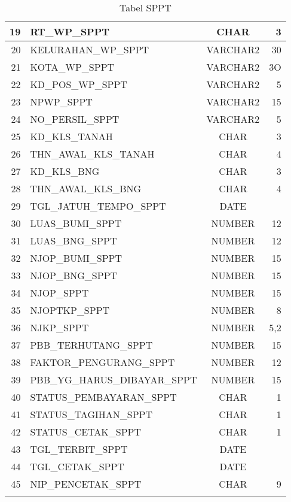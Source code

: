 \begin{enumerate}[1.]
\begin{longtable}{|r|l|c|r|}
    \hline
    19 & RT\_WP\_SPPT & CHAR & 3 \\
    \hline
    20 & KELURAHAN\_WP\_SPPT & VARCHAR2 & 30 \\
    \hline
    21 & KOTA\_WP\_SPPT & VARCHAR2 & 3O \\
    \hline
    22 & KD\_POS\_WP\_SPPT & VARCHAR2 & 5 \\
    \hline
    23 & NPWP\_SPPT & VARCHAR2 & 15 \\
    \hline
    24 & NO\_PERSIL\_SPPT & VARCHAR2 & 5 \\
    \hline
    25 & KD\_KLS\_TANAH & CHAR & 3 \\
    \hline
    26 & THN\_AWAL\_KLS\_TANAH & CHAR & 4 \\
    \hline
    27 & KD\_KLS\_BNG & CHAR & 3 \\
    \hline
    28 & THN\_AWAL\_KLS\_BNG & CHAR & 4 \\
    \hline
    29 & TGL\_JATUH\_TEMPO\_SPPT & DATE & \\
    \hline
    30 & LUAS\_BUMI\_SPPT & NUMBER & 12 \\
    \hline
    31 & LUAS\_BNG\_SPPT & NUMBER & 12 \\
    \hline
    32 & NJOP\_BUMI\_SPPT & NUMBER & 15 \\
    \hline
    33 & NJOP\_BNG\_SPPT & NUMBER & 15 \\
    \hline
    34 & NJOP\_SPPT & NUMBER & 15 \\
    \hline
    35 & NJOPTKP\_SPPT & NUMBER & 8 \\
    \hline
    36 & NJKP\_SPPT & NUMBER & 5,2 \\
    \hline
    37 & PBB\_TERHUTANG\_SPPT & NUMBER & 15 \\
    \hline
    38 & FAKTOR\_PENGURANG\_SPPT & NUMBER & 12 \\
    \hline
    39 & PBB\_YG\_HARUS\_DIBAYAR\_SPPT & NUMBER & 15 \\
    \hline
    40 & STATUS\_PEMBAYARAN\_SPPT & CHAR & 1 \\
    \hline
    41 & STATUS\_TAGIHAN\_SPPT & CHAR & 1 \\
    \hline
    42 & STATUS\_CETAK\_SPPT & CHAR & 1 \\
    \hline
    43 & TGL\_TERBIT\_SPPT & DATE & \\
    \hline
    44 & TGL\_CETAK\_SPPT & DATE & \\
    \hline
    45 & NIP\_PENCETAK\_SPPT & CHAR & 9 \\
    \hline
    \caption{Tabel SPPT}
  \end{longtable}
    

\end{enumerate}
